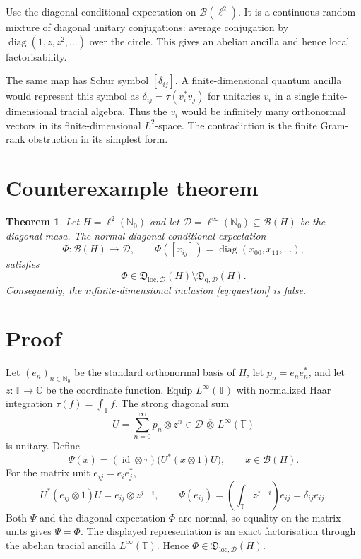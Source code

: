 \documentclass[11pt]{article}
\newcommand{\B}{\mathcal B}
\newcommand{\D}{\mathcal D}
\newcommand{\T}{\mathbb T}
\newcommand{\N}{\mathbb N_0}
\newcommand{\id}{\operatorname{id}}
\newtheorem{theorem}{Theorem}
\begin{document}
Use the diagonal conditional expectation on $\B(\ell^2)$.  It is a continuous
random mixture of diagonal unitary conjugations: average conjugation by
$\operatorname{diag}(1,z,z^2,\ldots)$ over the circle.  This gives an abelian
ancilla and hence local factorisability.

The same map has Schur symbol $[\delta_{ij}]$.  A finite-dimensional quantum
ancilla would represent this symbol as
$\delta_{ij}=\tau(v_i^*v_j)$ for unitaries $v_i$ in a single
finite-dimensional tracial algebra.  Thus the $v_i$ would be infinitely many
orthonormal vectors in its finite-dimensional $L^2$-space.  The contradiction
is the finite Gram-rank obstruction in its simplest form.

\section*{Counterexample theorem}

\begin{theorem}\label{thm:main}
Let $H=\ell^2(\N)$ and let $\D=\ell^\infty(\N)\subseteq\B(H)$ be the
diagonal masa.  The normal diagonal conditional expectation
\[
  \Phi:\B(H)\longrightarrow\D,
  \qquad
  \Phi([x_{ij}])=\operatorname{diag}(x_{00},x_{11},\ldots),
\]
satisfies
\[
  \Phi\in\mathfrak D_{\mathrm{loc},\D}(H)
  \setminus\mathfrak D_{\mathrm q,\D}(H).
\]
Consequently, the infinite-dimensional inclusion \eqref{eq:question} is
false.
\end{theorem}

\section*{Proof}

Let $(e_n)_{n\in\N}$ be the standard orthonormal basis of $H$, let
$p_n=e_ne_n^*$, and let $z:\T\to\mathbb C$ be the coordinate function.
Equip $L^\infty(\T)$ with normalized Haar integration $\tau(f)=\int_\T f$.
The strong diagonal sum
\[
  U=\sum_{n=0}^\infty p_n\otimes z^n
  \in \D\,\overline\otimes\,L^\infty(\T)
\]
is unitary.  Define
\[
  \Psi(x)=(\id\otimes\tau)\bigl(U^*(x\otimes1)U\bigr),
  \qquad x\in\B(H).
\]
For the matrix unit $e_{ij}=e_ie_j^*$,
\[
 U^*(e_{ij}\otimes1)U=e_{ij}\otimes z^{j-i},
 \qquad
 \Psi(e_{ij})=\left(\int_\T z^{j-i}\right)e_{ij}=\delta_{ij}e_{ij}.
\]
Both $\Psi$ and the diagonal expectation $\Phi$ are normal, so equality on
the matrix units gives $\Psi=\Phi$.  The displayed representation is an exact
factorisation through the abelian tracial ancilla $L^\infty(\T)$.  Hence
$\Phi\in\mathfrak D_{\mathrm{loc},\D}(H)$.
\end{document}
